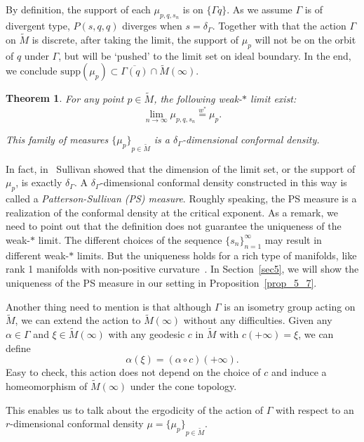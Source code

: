 \documentclass[reqno,11pt]{article}
\newtheorem{theorem}{Theorem}[section]
\theoremstyle{definition}
\theoremstyle{remark}
\numberwithin{equation}{section}
\begin{document}
By definition, the support of each $\mu_{p,q,s_n}$ is on $\{\Gamma q\}$. As we assume $\Gamma$ is of divergent type, $P(s,q,q)$ diverges when $s=\delta_\Gamma$. Together with that the action $\Gamma$ on $\widetilde{M}$ is discrete, after taking the limit, the support of $\mu_p$ will not be on the orbit of $q$ under $\Gamma$, but will be `pushed' to the limit set on ideal boundary. In the end, we conclude $\text{supp}(\mu_p)\subset \overline{\Gamma(q)}\cap\widetilde{M}(\infty)$.
\begin{theorem}
	For any point $p\in\widetilde{M}$, the following weak-$*$ limit exist:
	\begin{displaymath}
		\lim_{n\to\infty}\mu_{p,q,s_n}\overset{w^*}{=}\mu_p.
	\end{displaymath}

This family of measures ${\{\mu_p\}}_{p\in\widetilde{M}}$ is a $\delta_\Gamma$-dimensional conformal density.
\end{theorem}

In fact, in~\cite{Su2} Sullivan showed that the dimension of the limit set, or the support of $\mu_p$, is exactly $\delta_\Gamma$. A $\delta_\Gamma$-dimensional conformal density constructed in this way is called a \emph{Patterson-Sullivan (PS) measure}.  Roughly speaking, the PS measure is a realization of the conformal density at the critical exponent. As a remark, we need to point out that the definition does not guarantee the uniqueness of the weak-$*$ limit. The different choices of the sequence ${\{s_n\}}_{n=1}^\infty$ may result in different weak-$*$ limits. But the uniqueness holds for a rich type of manifolds, like rank 1 manifolds with non-positive curvature~\cite{Kn4}. In Section~\ref{sec5}, we will show the uniqueness of the PS measure in our setting in Proposition~\ref{prop_5_7}.

Another thing need to mention is that although $\Gamma$ is an isometry group acting on $\widetilde{M}$, we can extend the action to $\widetilde{M}(\infty)$ without any difficulties. Given any $\alpha\in\Gamma$ and $\xi\in\widetilde{M}(\infty)$ with any geodesic $c$ in $\widetilde{M}$ with $c(+\infty)=\xi$, we can define
\begin{displaymath}
	\alpha(\xi)=(\alpha\circ c)(+\infty).
\end{displaymath}
Easy to check, this action does not depend on the choice of $c$ and induce a homeomorphism of $\widetilde{M}(\infty)$ under the cone topology.

This enables us to talk about the ergodicity of the action of $\Gamma$ with respect to an $r$-dimensional conformal density $\mu={\{\mu_p\}}_{p\in\widetilde{M}}$.
\end{document}
